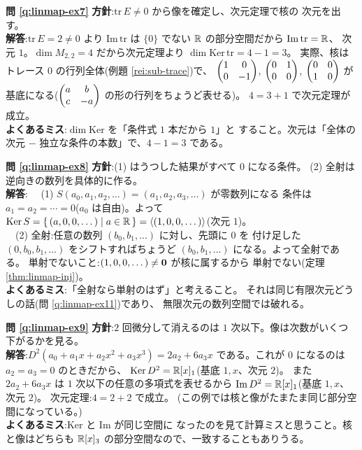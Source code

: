 \bigskip
\noindent\textbf{問 \ref{q:linmap-ex7}}\quad
\textbf{方針}:$\mathrm{tr}\,E \neq 0$ から像を確定し、次元定理で核の
次元を出す。\\
\textbf{解答}:$\mathrm{tr}\,E = 2 \neq 0$ より $\mathrm{Im}\,\mathrm{tr}$
は $\{0\}$ でない $\mathbb{R}$ の部分空間だから $\mathrm{Im}\,\mathrm{tr} = \mathbb{R}$、
次元 $1$。$\dim M_{2,2} = 4$ だから次元定理より
$\dim \mathrm{Ker}\,\mathrm{tr} = 4 - 1 = 3$。
実際、核はトレース $0$ の行列全体(例題 \ref{rei:sub-trace})で、
$\begin{pmatrix}1 & 0 \\ 0 & -1\end{pmatrix}$, $\begin{pmatrix}0 & 1 \\ 0 & 0\end{pmatrix}$, $\begin{pmatrix}0 & 0 \\ 1 & 0\end{pmatrix}$
が基底になる($\begin{pmatrix}a & b \\ c & -a\end{pmatrix}$ の形の行列をちょうど表せる)。
$4 = 3 + 1$ で次元定理が成立。\\
\textbf{よくあるミス}:$\dim \mathrm{Ker}$ を「条件式 $1$ 本だから $1$」と
すること。次元は「全体の次元 $-$ 独立な条件の本数」で、$4 - 1 = 3$ である。

\bigskip
\noindent\textbf{問 \ref{q:linmap-ex8}}\quad
\textbf{方針}:(1) はうつした結果がすべて $0$ になる条件。
(2) 全射は逆向きの数列を具体的に作る。\\
\textbf{解答}:
　(1) $S(a_0, a_1, a_2, \dots) = (a_1, a_2, a_3, \dots)$ が零数列になる
条件は $a_1 = a_2 = \cdots = 0$($a_0$ は自由)。よって
$\mathrm{Ker}\,S = \{\, (a, 0, 0, \dots) \mid a \in \mathbb{R} \,\}
= \langle (1, 0, 0, \dots) \rangle$(次元 $1$)。\\
　(2) 全射:任意の数列 $(b_0, b_1, \dots)$ に対し、先頭に $0$ を
付け足した $(0, b_0, b_1, \dots)$ をシフトすればちょうど
$(b_0, b_1, \dots)$ になる。よって全射である。
単射でないこと:$(1, 0, 0, \dots) \neq \bm{0}$ が核に属するから
単射でない(定理 \ref{thm:linmap-inj})。\\
\textbf{よくあるミス}:「全射なら単射のはず」と考えること。
それは同じ有限次元どうしの話(問 \ref{q:linmap-ex11})であり、
無限次元の数列空間では破れる。

\bigskip
\noindent\textbf{問 \ref{q:linmap-ex9}}\quad
\textbf{方針}:$2$ 回微分して消えるのは $1$ 次以下。像は次数がいくつ
下がるかを見る。\\
\textbf{解答}:$D^2(a_0 + a_1 x + a_2 x^2 + a_3 x^3) = 2a_2 + 6a_3 x$
である。これが $0$ になるのは $a_2 = a_3 = 0$ のときだから、
$\mathrm{Ker}\,D^2 = \mathbb{R}[x]_1$(基底 $1, x$、次元 $2$)。
また $2a_2 + 6a_3 x$ は $1$ 次以下の任意の多項式を表せるから
$\mathrm{Im}\,D^2 = \mathbb{R}[x]_1$(基底 $1, x$、次元 $2$)。
次元定理:$4 = 2 + 2$ で成立。
(この例では核と像がたまたま同じ部分空間になっている。)\\
\textbf{よくあるミス}:$\mathrm{Ker}$ と $\mathrm{Im}$ が同じ空間に
なったのを見て計算ミスと思うこと。核と像はどちらも
$\mathbb{R}[x]_3$ の部分空間なので、一致することもありうる。

